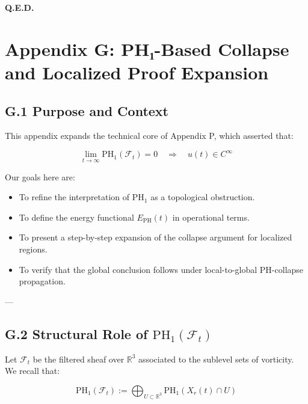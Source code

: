 \documentclass[11pt]{article}
\begin{document}
{\begin{flushright}
\textbf{Q.E.D.}
\end{flushright}




\section*{Appendix G: PH₁-Based Collapse and Localized Proof Expansion}

\subsection*{G.1 Purpose and Context}

This appendix expands the technical core of Appendix P, which asserted that:

\[
\lim_{t \to \infty} \mathrm{PH}_1(\mathcal{F}_t) = 0 \quad \Rightarrow \quad u(t) \in C^\infty
\]

Our goals here are:

\begin{itemize}
  \item To refine the interpretation of \( \mathrm{PH}_1 \) as a topological obstruction.
  \item To define the energy functional \( E_{\mathrm{PH}}(t) \) in operational terms.
  \item To present a step-by-step expansion of the collapse argument for localized regions.
  \item To verify that the global conclusion follows under local-to-global PH-collapse propagation.
\end{itemize}

---

\subsection*{G.2 Structural Role of \( \mathrm{PH}_1(\mathcal{F}_t) \)}

Let \( \mathcal{F}_t \) be the filtered sheaf over \( \mathbb{R}^3 \) associated to the sublevel sets of vorticity.  
We recall that:

\[
\mathrm{PH}_1(\mathcal{F}_t) := \bigoplus_{U \subset \mathbb{R}^3} \mathrm{PH}_1(X_r(t) \cap U)
\]

}
\end{document}
